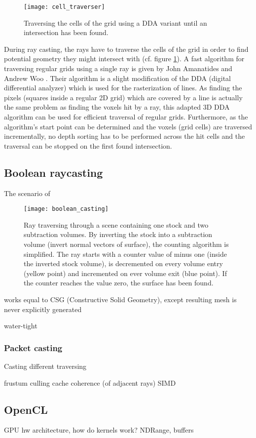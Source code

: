 \begin{figure}
\centering
\texttt{[image: cell\_traverser]}
\caption{Traversing the cells of the grid using a DDA variant until an intersection has been found.}
\label{fig:cell_traverser}
\end{figure}

During ray casting, the rays have to traverse the cells of the grid in order to find potential geometry they might intersect with (cf. figure \ref{fig:cell_traverser}). A fast algorithm for traversing regular grids using a single ray is given by John Amanatides and Andrew Woo \cite{3DDDA}. Their algorithm is a slight modification of the DDA (digital differential analyzer) which is used for the rasterization of lines. As finding the pixels (squares inside a regular 2D grid) which are covered by a line is actually the same problem as finding the voxels hit by a ray, this adapted 3D DDA algorithm can be used for efficient traversal of regular grids. Furthermore, as the algorithm's start point can be determined and the voxels (grid cells) are traversed incrementally, no depth sorting has to be performed across the hit cells and the traversal can be stopped on the first found intersection.


\subsection{Boolean raycasting}

The scenario of 

\begin{figure}
\centering
\texttt{[image: boolean\_casting]}
\caption{Ray traversing through a scene containing one stock and two subtraction volumes. By inverting the stock into a subtraction volume (invert normal vectors of surface), the counting algorithm is simplified. The ray starts with a counter value of minus one (inside the inverted stock volume), is decremented on every volume entry (yellow point) and incremented on ever volume exit (blue point). If the counter reaches the value zero, the surface has been found.}
\label{fig:boolean_casting} 
\end{figure}

works equal to CSG (Constructive Solid Geometry), except resulting mesh is never explicitly generated

water-tight

\subsubsection{Packet casting}

Casting 
different traversing

frustum culling
cache coherence (of adjacent rays)
SIMD




\subsection{OpenCL}

GPU hw architecture, how do kernels work? NDRange, buffers
